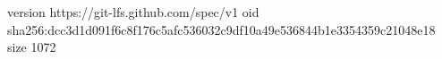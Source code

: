 version https://git-lfs.github.com/spec/v1
oid sha256:dcc3d1d091f6c8f176c5afc536032c9df10a49e536844b1e3354359c21048e18
size 1072
